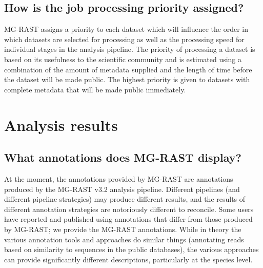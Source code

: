\documentclass[12pt,fullpage]{report}
\begin{document}
\subsection{How is the job processing priority assigned?}
MG-RAST assigns a priority to each dataset which will influence the order in which datasets are selected for processing as well as the processing speed for individual stages in the analysis pipeline. The priority of processing a dataset is based on its usefulness to the scientific community and is estimated using a combination of the amount of metadata supplied and the length of time before the dataset will be made public. The highest priority is given to datasets with complete metadata that will be made public immediately.

\section{Analysis results}
\subsection{What annotations does MG-RAST display?}
At the moment, the annotations provided by MG-RAST are annotations produced by the MG-RAST v3.2 analysis pipeline. Different pipelines (and different pipeline strategies) may produce different results, and the results of different annotation strategies are notoriously different to reconcile. Some users have reported and published using annotations that differ from those produced by MG-RAST; we provide the MG-RAST annotations. While in theory the various annotation tools and approaches do similar things (annotating reads based on similarity to sequences in the public databases), the various approaches can provide significantly different descriptions, particularly at the species level.
\end{document}
